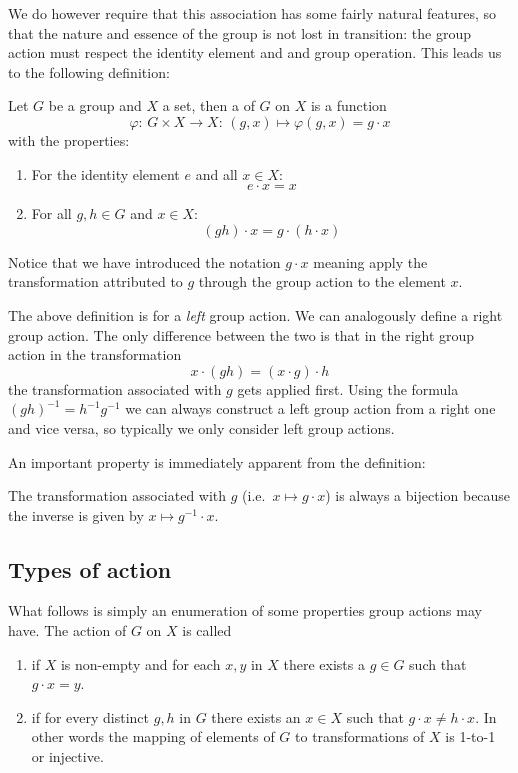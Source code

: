 We do however require that this association has some fairly natural features, so that the nature and essence of the group is not lost in transition: the group action must respect the identity element and and group operation. This leads us to the following definition:
\begin{definition}
Let $G$ be a group and $X$ a set, then a  of $G$ on $X$ is a function
\[ \varphi: \, G\times X \to X: \, (g,x)\mapsto \varphi(g,x) = g\cdot x \]
with the properties:
\begin{enumerate}
\item For the identity element $e$ and all $x\in X$: 
\[e\cdot x = x \]
\item For all $g,h \in G$ and $x\in X$:
\[ (gh)\cdot x = g\cdot (h\cdot x) \]
\end{enumerate}
Notice that we have introduced the notation $g\cdot x$ meaning apply the transformation attributed to $g$ through the group action to the element $x$.
\end{definition}

The above definition is for a \textit{left} group action. We can analogously define a right group action. The only difference between the two is that in the right group action in the transformation
\[ x \cdot (gh) = (x\cdot g)\cdot h \]
the transformation associated with $g$ gets applied first. Using the formula $(gh)^{-1} = h^{-1}g^{-1}$ we can always construct a left group action from a right one and vice versa, so typically we only consider left group actions.

An important property is immediately apparent from the definition:
\begin{eigenschap}
The transformation associated with $g$ (i.e.\ $x\mapsto g\cdot x$) is always a bijection because the inverse is given by $x \mapsto g^{-1}\cdot x$.
\end{eigenschap}

\subsection{Types of action}
What follows is simply an enumeration of some properties group actions may have. The action of $G$ on $X$ is called
\begin{enumerate}
\item {} if $X$ is non-empty and for each $x,y$ in $X$ there exists a $g \in G$ such that $g\cdot x = y$.
\item {} if for every distinct $g,h$ in $G$ there exists an $x \in X$ such that $g\cdot x \neq h\cdot x$. In other words the mapping of elements of $G$ to transformations of $X$ is 1-to-1 or injective.
\end{enumerate}

